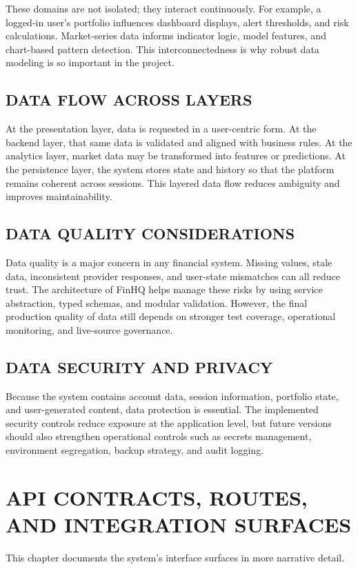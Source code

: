 \documentclass[12pt,a4paper]{report}
\newcommand{\projectshort}{FinHQ}
\begin{document}
These domains are not isolated; they interact continuously. For example, a logged-in user's portfolio influences dashboard displays, alert thresholds, and risk calculations. Market-series data informs indicator logic, model features, and chart-based pattern detection. This interconnectedness is why robust data modeling is so important in the project.

\section{DATA FLOW ACROSS LAYERS}
At the presentation layer, data is requested in a user-centric form. At the backend layer, that same data is validated and aligned with business rules. At the analytics layer, market data may be transformed into features or predictions. At the persistence layer, the system stores state and history so that the platform remains coherent across sessions. This layered data flow reduces ambiguity and improves maintainability.

\section{DATA QUALITY CONSIDERATIONS}
Data quality is a major concern in any financial system. Missing values, stale data, inconsistent provider responses, and user-state mismatches can all reduce trust. The architecture of \projectshort{} helps manage these risks by using service abstraction, typed schemas, and modular validation. However, the final production quality of data still depends on stronger test coverage, operational monitoring, and live-source governance.

\section{DATA SECURITY AND PRIVACY}
Because the system contains account data, session information, portfolio state, and user-generated content, data protection is essential. The implemented security controls reduce exposure at the application level, but future versions should also strengthen operational controls such as secrets management, environment segregation, backup strategy, and audit logging.

\chapter{API CONTRACTS, ROUTES, AND INTEGRATION SURFACES}
This chapter documents the system's interface surfaces in more narrative detail.
\end{document}
